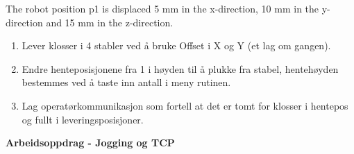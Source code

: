 The robot position p1 is displaced 5 mm in the x-direction, 10 mm
in the y-direction and 15 mm in the z-direction.
\begin{enumerate}
\item Lever klosser i 4 stabler ved å bruke Offset i X og Y (et lag om gangen). 
\item Endre henteposisjonene fra 1 i høyden til å plukke fra stabel, hentehøyden
bestemmes ved å taste inn antall i meny rutinen. 
\item Lag operatørkommunikasjon som fortell at det er tomt for klosser i
hentepos og fullt i leveringsposisjoner.
\end{enumerate}
\newpage{}














\vfil \eject















\textbf{Arbeidsoppdrag - Jogging og TCP}


